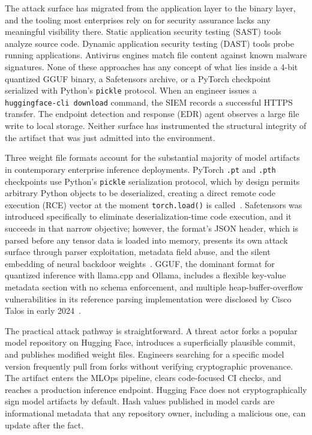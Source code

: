 \documentclass[sigconf,review]{acmart}
\begin{document}
The attack surface has migrated from the application layer to the binary
layer, and the tooling most enterprises rely on for security assurance lacks
any meaningful visibility there. Static application security testing (SAST)
tools analyze source code. Dynamic application security testing (DAST)
tools probe running applications. Antivirus engines match file content against
known malware signatures. None of these approaches has any concept of what
lies inside a 4-bit quantized GGUF binary, a Safetensors archive, or a
PyTorch checkpoint serialized with Python's \texttt{pickle} protocol. When
an engineer issues a \texttt{huggingface-cli download} command, the SIEM
records a successful HTTPS transfer. The endpoint detection and response
(EDR) agent observes a large file write to local storage. Neither surface
has instrumented the structural integrity of the artifact that was just
admitted into the environment.

Three weight file formats account for the substantial majority of model
artifacts in contemporary enterprise inference deployments. PyTorch
\texttt{.pt} and \texttt{.pth} checkpoints use Python's \texttt{pickle}
serialization protocol, which by design permits arbitrary Python objects to
be deserialized, creating a direct remote code execution (RCE) vector at
the moment \texttt{torch.load()} is called~\cite{pickleball2025}. Safetensors
was introduced specifically to eliminate deserialization-time code execution,
and it succeeds in that narrow objective; however, the format's JSON header,
which is parsed before any tensor data is loaded into memory, presents its
own attack surface through parser exploitation, metadata field abuse, and
the silent embedding of neural backdoor weights~\cite{safetensors2025empirical}.
GGUF, the dominant format for quantized inference with llama.cpp and Ollama,
includes a flexible key-value metadata section with no schema enforcement, and
multiple heap-buffer-overflow vulnerabilities in its reference parsing
implementation were disclosed by Cisco Talos in early 2024~\cite{gguf_quantization_attack2024}.

The practical attack pathway is straightforward. A threat actor forks a
popular model repository on Hugging Face, introduces a superficially plausible
commit, and publishes modified weight files. Engineers searching for a
specific model version frequently pull from forks without verifying
cryptographic provenance. The artifact enters the MLOps pipeline, clears
code-focused CI checks, and reaches a production inference endpoint. Hugging
Face does not cryptographically sign model artifacts by default. Hash values
published in model cards are informational metadata that any repository
owner, including a malicious one, can update after the fact.
\end{document}
